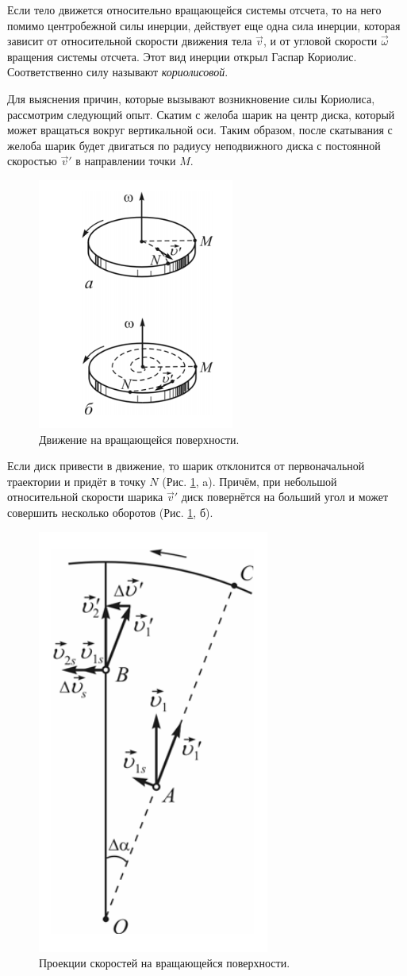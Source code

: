 Если тело движется относительно вращающейся системы отсчета, то на него
помимо центробежной силы инерции, действует еще одна сила инерции, которая
зависит от относительной скорости движения тела $\vec{v}$, и от угловой скорости $\vec{\omega}$ вращения системы отсчета. Этот вид инерции открыл Гаспар Кориолис. Соответственно силу называют \textit{кориолисовой}.

Для выяснения причин, которые вызывают возникновение силы Кориолиса, рассмотрим следующий опыт. Скатим с желоба шарик на центр диска, который может вращаться вокруг вертикальной оси. Таким образом, после
скатывания с желоба шарик будет двигаться по радиусу
неподвижного диска с постоянной скоростью $\vec{v}'$ в направлении точки $M$. 

\begin{figure}[h]  %
	\centering
	\includegraphics[height=0.4\textwidth]{imgs/rotation.png}  %
	\caption{Движение на вращающейся поверхности.}  %
	\label{fig:rotation}  %
\end{figure}


Если диск привести в движение, то шарик отклонится от первоначальной траектории и придёт в точку $N$ (Рис. \ref{fig:rotation}, a). Причём, при небольшой относительной скорости шарика $\vec{v}'$ диск повернётся на больший угол и может совершить несколько оборотов (Рис. \ref{fig:rotation}, б).

\begin{figure}[h]  %
	\centering
	\includegraphics[height=0.6\textwidth]{imgs/velocity.png}  %
	\caption{Проекции скоростей на вращающейся поверхности.}  %
	\label{fig:velocity}  %
\end{figure}

